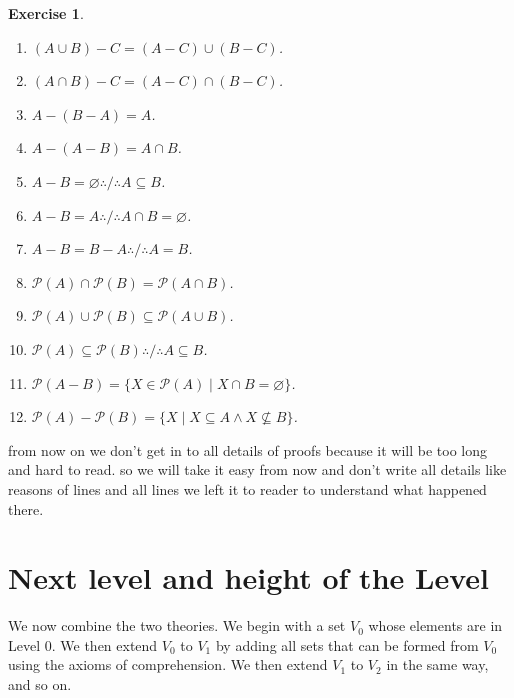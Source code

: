 \documentclass[10pt,a4paper]{book}
\newtheorem{definition}{definition}[section]
\newtheorem{exercise}{Exercise}[section]
\begin{document}
\begin{exercise}
\begin{enumerate}
        \item $(A\cup B)-C=(A-C)\cup(B-C)$.
        \item $(A\cap B)-C=(A-C)\cap(B-C)$.
        \item $A-(B-A)=A$.
        \item $A-(A-B)=A\cap B$.
        \item $A-B=\varnothing \therefore / \therefore A\subseteq B$.
        \item $A-B=A \therefore / \therefore A\cap B=\varnothing$.
        \item $A-B=B-A \therefore / \therefore A=B$.
        \item $\mathcal P(A)\cap\mathcal P(B)=\mathcal P(A\cap B)$.
        \item $\mathcal P(A)\cup\mathcal P(B)\subseteq\mathcal P(A\cup B)$.
        \item $\mathcal P(A)\subseteq\mathcal P(B) \therefore / \therefore A\subseteq B$.
        \item $\mathcal P(A-B) =\{X\in\mathcal P(A)\mid X\cap B=\varnothing\}$.
        \item $\mathcal P(A) - \mathcal P(B) =\{X \mid X \subseteq A \land X\nsubseteq B\}$.
    \end{enumerate}
\end{exercise}


from now on we don't get in to all details of proofs because it will be too
long and hard to read. so we will take it easy from now and don't write all
details like reasons of lines and all lines we left it to reader to understand
what happened there.




\section{Next level and height of the Level}

\label{combinational-set-theory}

We now combine the two theories.  We begin with a set \(V_0\) whose
elements are in Level 0.  We then extend \(V_0\) to \(V_1\)
by adding all sets that can be formed from \(V_0\) using the axioms of
comprehension.  We then extend \(V_1\) to
\(V_2\) in the same way, and so on.


\end{document}

